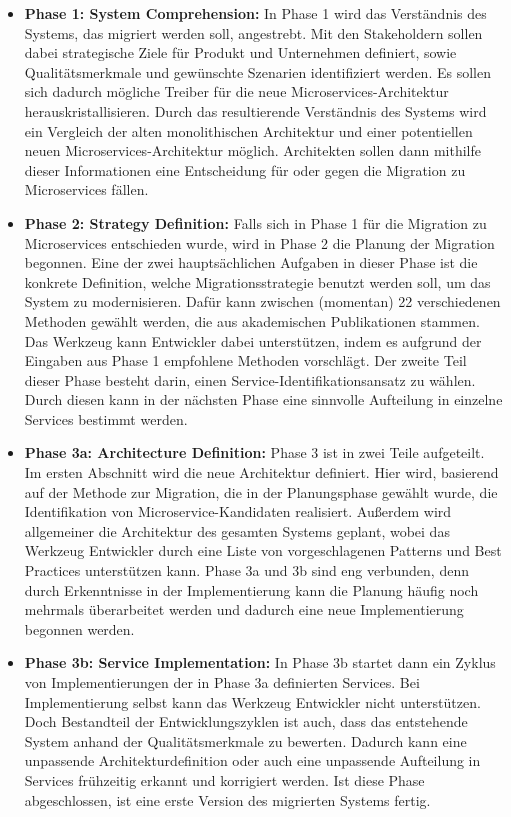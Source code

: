 \begin{itemize}
	\item \textbf{Phase 1: System Comprehension:}
	In Phase 1 wird das Verständnis des Systems, das migriert werden soll, angestrebt.
	Mit den Stakeholdern sollen dabei strategische Ziele für Produkt und Unternehmen definiert, sowie Qualitätsmerkmale und gewünschte Szenarien identifiziert werden.
	Es sollen sich dadurch mögliche Treiber für die neue Microservices-Architektur herauskristallisieren.
	Durch das resultierende Verständnis des Systems wird ein Vergleich der alten monolithischen Architektur und einer potentiellen neuen Microservices-Architektur möglich.
	Architekten sollen dann mithilfe dieser Informationen eine Entscheidung für oder gegen die Migration zu Microservices fällen.
	\item \textbf{Phase 2: Strategy Definition:}
	Falls sich in Phase 1 für die Migration zu Microservices entschieden wurde, wird in Phase 2 die Planung der Migration begonnen.
	Eine der zwei hauptsächlichen Aufgaben in dieser Phase ist die konkrete Definition, welche Migrationsstrategie benutzt werden soll, um das System zu modernisieren.
	Dafür kann zwischen (momentan) 22 verschiedenen Methoden gewählt werden, die aus akademischen Publikationen stammen.
	Das Werkzeug kann Entwickler dabei unterstützen, indem es aufgrund der Eingaben aus Phase 1 empfohlene Methoden vorschlägt.
	Der zweite Teil dieser Phase besteht darin, einen Service-Identifikationsansatz zu wählen.
	Durch diesen kann in der nächsten Phase eine sinnvolle Aufteilung in einzelne Services bestimmt werden.
	\item \textbf{Phase 3a: Architecture Definition:}
	Phase 3 ist in zwei Teile aufgeteilt.
	Im ersten Abschnitt wird die neue Architektur definiert.
	Hier wird, basierend auf der Methode zur Migration, die in der Planungsphase gewählt wurde, die Identifikation von Microservice-Kandidaten realisiert.
	Außerdem wird allgemeiner die Architektur des gesamten Systems geplant, wobei das Werkzeug Entwickler durch eine Liste von vorgeschlagenen Patterns und Best Practices unterstützen kann.
	 Phase 3a und 3b sind eng verbunden, denn durch Erkenntnisse in der Implementierung kann die Planung häufig noch mehrmals überarbeitet werden und dadurch eine neue Implementierung begonnen werden.
	\item \textbf{Phase 3b: Service Implementation:} In Phase 3b startet dann ein Zyklus von Implementierungen der in Phase 3a definierten Services.
	Bei Implementierung selbst kann das Werkzeug Entwickler nicht unterstützen.
	Doch Bestandteil der Entwicklungszyklen ist auch, dass das entstehende System anhand der Qualitätsmerkmale zu bewerten.
	Dadurch kann eine unpassende Architekturdefinition oder auch eine unpassende Aufteilung in Services frühzeitig erkannt und korrigiert werden.
	Ist diese Phase abgeschlossen, ist eine erste Version des migrierten Systems fertig.
\end{itemize}

